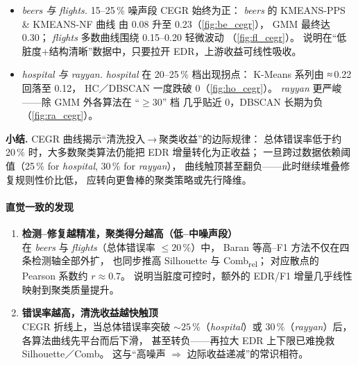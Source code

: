 \documentclass[10pt]{article} %
\numberwithin{equation}{section}
\begin{document}
\begin{itemize}[leftmargin=1.6em,topsep=2pt,itemsep=2pt]
  \item \emph{beers 与 flights.}  
        15–25\,\% 噪声段 CEGR 始终为正：%
        \emph{beers} 的 KMEANS-PPS \& KMEANS-NF 曲线 %
        由 0.08 升至 0.23（\ref{fig:be_cegr}），%
        GMM 最终达 0.30；%
        \emph{flights} 多数曲线围绕 0.15–0.20 轻微波动 %
        （\ref{fig:fl_cegr}）。  
        说明在“低脏度+结构清晰”数据中，只要拉开 EDR，上游收益可线性吸收。  

  \item \emph{hospital 与 rayyan.}  
        \emph{hospital} 在 20–25\,\% 档出现拐点：%
        K-Means 系列由 ≈\,0.22 回落至 0.12，%
        HC／DBSCAN 一度跌破 0（\ref{fig:ho_cegr}）。  
        \emph{rayyan} 更严峻——除 GMM 外各算法在 ``\(\ge30\)'' 档 %
        几乎贴近 0，DBSCAN 长期为负 %
        （\ref{fig:ra_cegr}）。  
\end{itemize}

\noindent\textbf{小结.}  
CEGR 曲线揭示“清洗投入 → 聚类收益”的边际规律：%
总体错误率低于约 20\,\% 时，大多数聚类算法仍能把 EDR 增量转化为正收益；%
一旦跨过数据依赖阈值（25\,\% for \emph{hospital}, 30\,\% for \emph{rayyan}），%
曲线触顶甚至翻负——此时继续堆叠修复规则性价比低，%
应转向更鲁棒的聚类策略或先行降维。

\paragraph{直觉一致的发现}
\begin{enumerate}[label=\textbf{\arabic*.},leftmargin=1.6em,itemsep=3pt]
  \item \textbf{检测–修复越精准，聚类得分越高（低–中噪声段） \\}  
        在 \emph{beers} 与 \emph{flights}（总体错误率 $\le 20\,\%$）中，%
        Baran 等高–F1 方法不仅在四条检测轴全部外扩，%
        也同步推高 Silhouette 与 Comb\textsubscript{rel}；%
        对应散点的 Pearson 系数约 $r\!\approx\!0.7$。%
        说明当脏度可控时，额外的 EDR/F1 增量几乎线性映射到聚类质量提升。
        
  \item \textbf{错误率越高，清洗收益越快触顶 \\}  
        CEGR 折线上，当总体错误率突破 $\sim25\,\%$（\emph{hospital}）或
        $30\,\%$（\emph{rayyan}）后，各算法曲线先平台而后下滑，%
        甚至转负——再拉大 EDR 上下限已难挽救 Silhouette／Comb。%
        这与“高噪声 $\Rightarrow$ 边际收益递减”的常识相符。
\end{enumerate}
\end{document}
